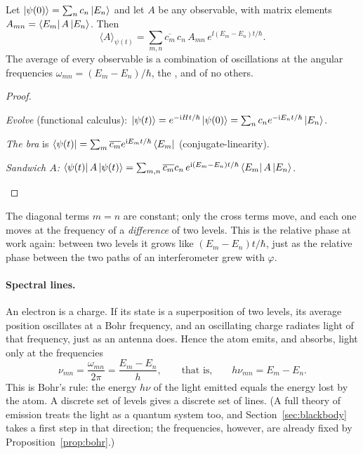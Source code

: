 \begin{proposition}\label{prop:bohr}
  Let $\left|\psi(0)\right\rangle=\sum_nc_n\left|E_n\right\rangle$ and let $A$ be any observable, with matrix elements $A_{mn}=\left\langle E_m\right|A\left|E_n\right\rangle$. Then
  \[
    \langle A\rangle_{\psi(t)}=\sum_{m,n}\overline{c_m}\,c_n\,A_{mn}\,e^{\ii(E_m-E_n)t/\hbar}.
  \]
  The average of every observable is a combination of oscillations at the angular frequencies $\omega_{mn}=(E_m-E_n)/\hbar$, the , and of no others.
\end{proposition}
\begin{proof}
  \begin{steps}
    \item \emph{Evolve} (functional calculus): $\left|\psi(t)\right\rangle=e^{-\mathrm{i} Ht/\hbar}\left|\psi(0)\right\rangle=\sum_nc_ne^{-\mathrm{i} E_nt/\hbar}\left|E_n\right\rangle$.
    \item \emph{The bra} is $\left\langle\psi(t)\right|=\sum_m\overline{c_m}e^{\mathrm{i} E_mt/\hbar}\left\langle E_m\right|$ (conjugate-linearity).
    \item \emph{Sandwich $A$:} $\left\langle\psi(t)\right|A\left|\psi(t)\right\rangle=\sum_{m,n}\overline{c_m}c_n\,e^{\mathrm{i}(E_m-E_n)t/\hbar}\left\langle E_m\right|A\left|E_n\right\rangle$. \qedhere
  \end{steps}
\end{proof}

The diagonal terms $m=n$ are constant; only the cross terms move, and each one moves at the frequency of a \emph{difference} of two levels. This is the relative phase at work again: between two levels it grows like $(E_m-E_n)t/\hbar$, just as the relative phase between the two paths of an interferometer grew with $\varphi$.

\paragraph{Spectral lines.}
An electron is a charge. If its state is a superposition of two levels, its average position oscillates at a Bohr frequency, and an oscillating charge radiates light of that frequency, just as an antenna does. Hence the atom emits, and absorbs, light only at the frequencies
\[
  \nu_{mn}=\frac{\omega_{mn}}{2\pi}=\frac{E_m-E_n}{h},\qquad\text{that is,}\qquad h\nu_{mn}=E_m-E_n .
\]
This is Bohr's rule: the energy $h\nu$ of the light emitted equals the energy lost by the atom. A discrete set of levels gives a discrete set of lines. (A full theory of emission treats the light as a quantum system too, and Section~\ref{sec:blackbody} takes a first step in that direction; the frequencies, however, are already fixed by Proposition~\ref{prop:bohr}.)

